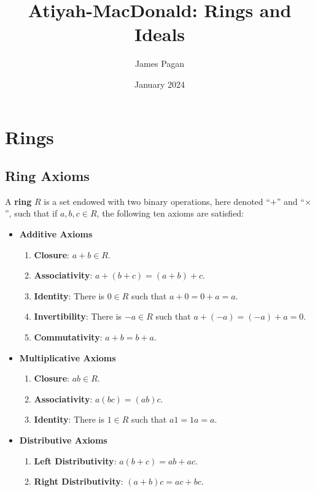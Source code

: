 \documentclass[11pt]{article}
\title{Atiyah-MacDonald: Rings and Ideals}
\author{James Pagan}
\date{January 2024}
\begin{document}
\maketitle
\tableofcontents
\newpage


\section{Rings}


\subsection{Ring Axioms}

A \textbf{ring} $R$ is a set endowed with two binary operations, here denoted ``$+$'' and ``$\times$'', such that if $a, b, c \in R$, the following ten axioms are satisfied:

\begin{itemize}
	\item \textbf{Additive Axioms}
	\begin{enumerate}
		\item \textbf{Closure}: $a + b \in R$.
		\item \textbf{Associativity}: $a + (b + c) = (a + b) + c$.
		\item \textbf{Identity}: There is $0 \in R$ such that $a + 0 = 0 + a = a$.
		\item \textbf{Invertibility}: There is $-a \in R$ such that $a + (-a) = (-a) + a = 0$.
		\item \textbf{Commutativity}: $a + b = b + a$.
	\end{enumerate}
	\item \textbf{Multiplicative Axioms}
	\begin{enumerate}\addtocounter{enumi}{5}
		\item \textbf{Closure}: $ab \in R$.
		\item \textbf{Associativity}: $a(bc) = (ab)c$.
		\item \textbf{Identity}: There is $1 \in R$ such that $a1 = 1a = a$.
	\end{enumerate}
	\item \textbf{Distributive Axioms}
	\begin{enumerate}\addtocounter{enumi}{8}
		\item \textbf{Left Distributivity}: $a(b + c) = ab + ac$.
		\item \textbf{Right Distributivity}: $(a + b)c = ac + bc$.
	\end{enumerate}
\end{itemize}
\end{document}
